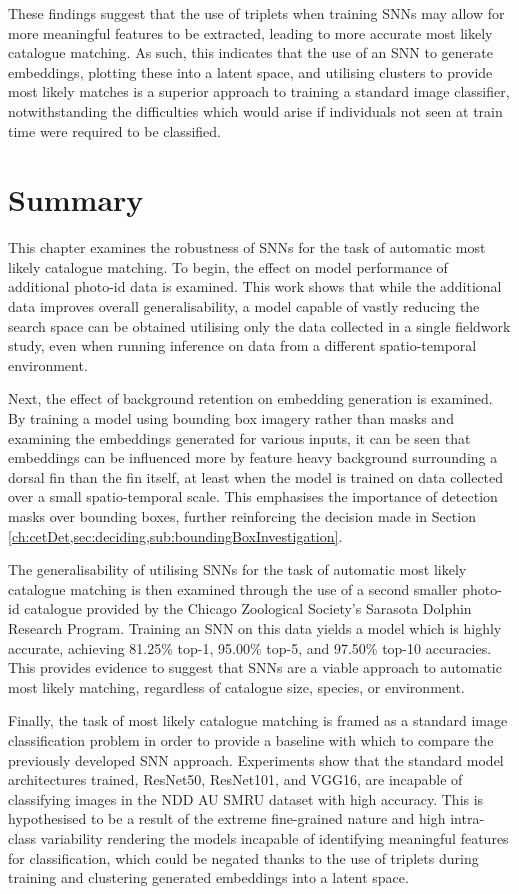 These findings suggest that the use of triplets when training SNNs may allow for more meaningful features to be extracted, leading to more accurate most likely catalogue matching. As such, this indicates that the use of an SNN to generate embeddings, plotting these into a latent space, and utilising clusters to provide most likely matches is a superior approach to training a standard image classifier, notwithstanding the difficulties which would arise if individuals not seen at train time were required to be classified.

\section{Summary}\label{ch:SNNEvaluation,sec:Summary}

This chapter examines the robustness of SNNs for the task of automatic most likely catalogue matching. To begin, the effect on model performance of additional photo-id data is examined. This work shows that while the additional data improves overall generalisability, a model capable of vastly reducing the search space can be obtained utilising only the data collected in a single fieldwork study, even when running inference on data from a different spatio-temporal environment.

Next, the effect of background retention on embedding generation is examined. By training a model using bounding box imagery rather than masks and examining the embeddings generated for various inputs, it can be seen that embeddings can be influenced more by feature heavy background surrounding a dorsal fin than the fin itself, at least when the model is trained on data collected over a small spatio-temporal scale. This emphasises the importance of detection masks over bounding boxes, further reinforcing the decision made in Section \ref{ch:cetDet,sec:deciding,sub:boundingBoxInvestigation}.

The generalisability of utilising SNNs for the task of automatic most likely catalogue matching is then examined through the use of a second smaller photo-id catalogue provided by the Chicago Zoological Society's Sarasota Dolphin Research Program. Training an SNN on this data yields a model which is highly accurate, achieving 81.25\% top-1, 95.00\% top-5, and 97.50\% top-10 accuracies. This provides evidence to suggest that SNNs are a viable approach to automatic most likely matching, regardless of catalogue size, species, or environment.

Finally, the task of most likely catalogue matching is framed as a standard image classification problem in order to provide a baseline with which to compare the previously developed SNN approach. Experiments show that the standard model architectures trained, ResNet50, ResNet101, and VGG16, are incapable of classifying images in the NDD AU SMRU dataset with high accuracy. This is hypothesised to be a result of the extreme fine-grained nature and high intra-class variability rendering the models incapable of identifying meaningful features for classification, which could be negated thanks to the use of triplets during training and clustering generated embeddings into a latent space.

